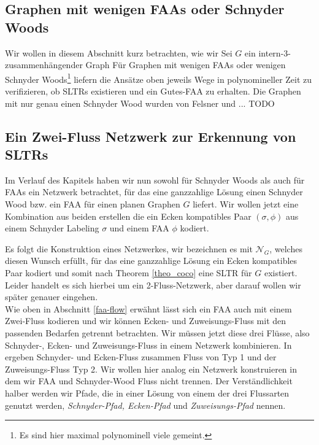 

\subsection{Graphen mit wenigen FAAs oder Schnyder Woods}

Wir wollen in diesem Abschnitt kurz betrachten, wie wir 
Sei $G$ ein intern-3-zusammenhängender Graph 
Für Graphen mit wenigen FAAs oder wenigen Schnyder Woods\footnote{Es sind hier maximal polynominell viele gemeint.} liefern die Ansätze oben jeweils Wege in polynomineller Zeit zu verifizieren, ob SLTRs existieren und ein Gutes-FAA zu erhalten. Die Graphen mit nur genau einen Schnyder Wood wurden von Felsner und ... TODO 

\subsection{Ein Zwei-Fluss Netzwerk zur Erkennung von SLTRs}

Im Verlauf des Kapitels haben wir nun sowohl für Schnyder Woods als auch für FAAs ein Netzwerk betrachtet, für das eine ganzzahlige Lösung einen Schnyder Wood bzw. ein FAA für einen planen Graphen $G$ liefert. Wir wollen jetzt eine Kombination aus beiden erstellen die ein Ecken kompatibles Paar $(\sigma,\phi)$ aus einem Schnyder Labeling $\sigma$ und einem FAA $\phi$  kodiert.\

Es folgt die Konstruktion eines Netzwerkes, wir bezeichnen es mit $\mathcal{N}_G$, welches diesen Wunsch erfüllt, für das eine ganzzahlige Lösung ein Ecken kompatibles Paar kodiert und somit nach Theorem \ref{theo_coco} eine SLTR für $G$ existiert. Leider handelt es sich hierbei um ein 2-Fluss-Netzwerk, aber darauf wollen wir später genauer eingehen.\\

Wie oben in Abschnitt \ref{faa-flow} erwähnt lässt sich ein FAA auch mit einem Zwei-Fluss kodieren und wir können Ecken- und Zuweisungs-Fluss mit den passenden Bedarfen getrennt betrachten. Wir müssen jetzt diese drei Flüsse, also Schnyder-, Ecken- und Zuweisungs-Fluss in einem Netzwerk kombinieren. In \cite{af15} ergeben Schnyder- und Ecken-Fluss zusammen Fluss von Typ 1 und der Zuweisungs-Fluss Typ 2. Wir wollen hier analog ein Netzwerk konstruieren in dem wir FAA und Schnyder-Wood Fluss nicht trennen. Der Verständlichkeit halber werden wir Pfade, die in einer Lösung von einem der drei Flussarten genutzt werden, \textit{Schnyder-Pfad, Ecken-Pfad} und \textit{Zuweisungs-Pfad} nennen.\\

